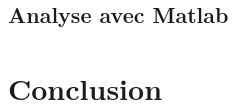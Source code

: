\documentclass{udes_rapport} %
\begin{document}
\subsection{Analyse avec Matlab}

\section{Conclusion}

\begin{comment}
\begin{center}
	\centering
	\texttt{[image: puissance]}
	\captionof{figure}{Spectre de puissance d'une onde de 1kHz}
	\label{puissance}
\end{center}


\section{Filtres FIR}
\noindent\begin{minipage}{\textwidth} 
\begin{minipage}{0.5\textwidth}
  \centering
  \texttt{[image: ampFIR]}
  \captionof{subfigure}{Amplitude}
  \label{FIR:ampFIR}
\end{minipage}%
\begin{minipage}{0.5\textwidth}
  \centering 
  \texttt{[image: phaseCute]} 
  \captionof{subfigure}{Phase} 
  \label{FIR:phaseFIR} 
\end{minipage} 
\captionof{figure}{Filtre IIR} 
\label{FIR} 
\end{minipage}
\end{comment}
\end{document}

